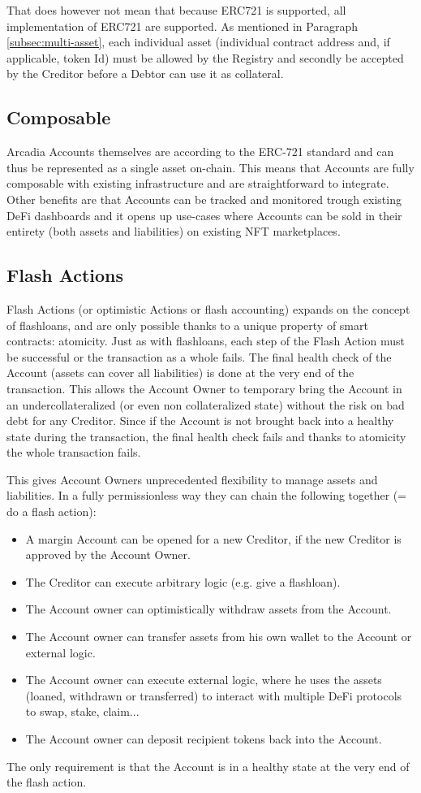 \documentclass[sigconf,nonacm]{acmart}
\begin{document}
That does however not mean that because ERC721 is supported, all implementation of ERC721 are supported.
As mentioned in Paragraph \ref{subsec:multi-asset}, each individual asset (individual contract address and, if applicable, token Id)
must be allowed by the Registry and secondly be accepted by the Creditor before a Debtor can use it as collateral.

\subsection{Composable}
Arcadia Accounts themselves are according to the ERC-721 standard and can thus be represented as a single asset on-chain.
This means that Accounts are fully composable with existing infrastructure and are straightforward to integrate.
Other benefits are that Accounts can be tracked and monitored trough existing DeFi dashboards and it opens up use-cases where Accounts can be sold in their entirety (both assets and liabilities) on existing NFT marketplaces.

\subsection{Flash Actions}
Flash Actions (or optimistic Actions or flash accounting) expands on the concept of flashloans, and are only possible thanks to a unique property of smart contracts: atomicity\cite{xie2022towards}.
Just as with flashloans, each step of the Flash Action must be successful or the transaction as a whole fails.
The final health check of the Account (assets can cover all liabilities) is done at the very end of the transaction.
This allows the Account Owner to temporary bring the Account in an undercollateralized (or even non collateralized state) without the risk on bad debt for any Creditor.
Since if the Account is not brought back into a healthy state during the transaction, the final health check fails and thanks to atomicity the whole transaction fails.

This gives Account Owners unprecedented flexibility to manage assets and liabilities.
In a fully permissionless way they can chain the following together (= do a flash action):
\begin{itemize}
    \item A margin Account can be opened for a new Creditor, if the new Creditor is approved by the Account Owner.
    \item The Creditor can execute arbitrary logic (e.g. give a flashloan).
    \item The Account owner can optimistically withdraw assets from the Account.
    \item The Account owner can transfer assets from his own wallet to the Account or external logic.
    \item The Account owner can execute external logic, where he uses the assets (loaned, withdrawn or transferred) to interact with multiple DeFi protocols to swap, stake, claim...
    \item The Account owner can deposit recipient tokens back into the Account.
\end{itemize}
The only requirement is that the Account is in a healthy state at the very end of the flash action.
\end{document}
